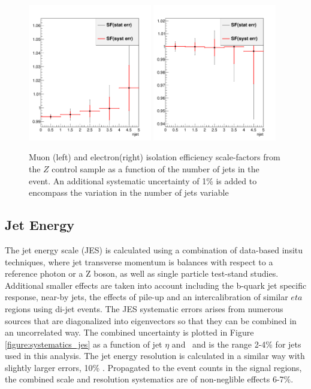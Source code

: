 \begin{figure}[htbp]
\begin{center}
\includegraphics[width=0.48\textwidth]{figs/systematics/MuTP_sf_njet_ALP}
\includegraphics[width=0.48\textwidth]{figs/systematics/EleTP_sf_njet_ALP}
\caption{Muon (left) and electron(right) isolation efficiency scale-factors from the $Z$ control sample as a function of the number of jets in the event. An additional systematic uncertainty of 1\% is added to encompass the variation in the number of jets variable}
\label{figure:systematics_iso}
\end{center}
\end{figure}


\subsection{Jet Energy}

The jet energy scale (JES) is calculated using a combination of data-based insitu techniques, where jet transverse momentum is balances with respect to a reference photon or a Z boson, as well as single particle test-stand studies\cite{Aad:2014bia}. Additional smaller effects are taken into account including the b-quark jet specific response, near-by jets, the effects of pile-up and an intercalibration of similar $eta$ regions using di-jet events. The JES systematic errors arises from numerous sources that are diagonalized into eigenvectors so that they can be combined in an uncorrelated way. The combined uncertainty is plotted in Figure \ref{figure:systematics_jes} as a function of jet $\eta$ and \pt\ and is the range 2-4\% for jets used in this analysis. The jet energy resolution is calculated in a similar way with slightly larger errors, 10\% \cite{Aad:2012ag}. Propagated to the event counts in the signal regions, the combined scale and resolution systematics are of non-neglible effects 6-7\%.  


